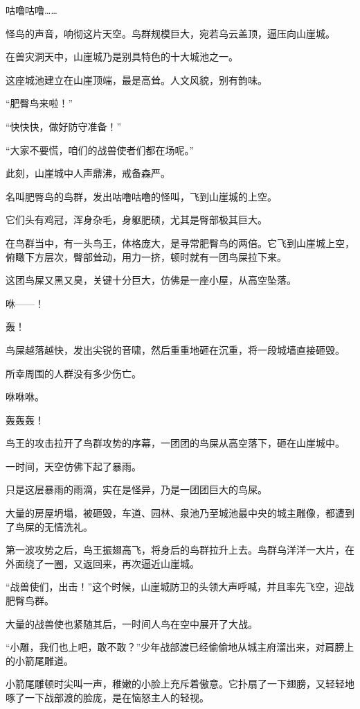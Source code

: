 
\begin{this_body}

咕噜咕噜……

怪鸟的声音，响彻这片天空。鸟群规模巨大，宛若乌云盖顶，逼压向山崖城。

在兽灾洞天中，山崖城乃是别具特色的十大城池之一。

这座城池建立在山崖顶端，最是高耸。人文风貌，别有韵味。

“肥臀鸟来啦！”

“快快快，做好防守准备！”

“大家不要慌，咱们的战兽使者们都在场呢。”

此刻，山崖城中人声鼎沸，戒备森严。

名叫肥臀鸟的鸟群，发出咕噜咕噜的怪叫，飞到山崖城的上空。

它们头有鸡冠，浑身杂毛，身躯肥硕，尤其是臀部极其巨大。

在鸟群当中，有一头鸟王，体格庞大，是寻常肥臀鸟的两倍。它飞到山崖城上空，俯瞰下方层次，臀部耸动，用力一挤，顿时就有一团鸟屎拉下来。

这团鸟屎又黑又臭，关键十分巨大，仿佛是一座小屋，从高空坠落。

咻——！

轰！

鸟屎越落越快，发出尖锐的音啸，然后重重地砸在沉重，将一段城墙直接砸毁。

所幸周围的人群没有多少伤亡。

咻咻咻。

轰轰轰！

鸟王的攻击拉开了鸟群攻势的序幕，一团团的鸟屎从高空落下，砸在山崖城中。

一时间，天空仿佛下起了暴雨。

只是这层暴雨的雨滴，实在是怪异，乃是一团团巨大的鸟屎。

大量的房屋坍塌，被砸毁，车道、园林、泉池乃至城池最中央的城主雕像，都遭到了鸟屎的无情洗礼。

第一波攻势之后，鸟王振翅高飞，将身后的鸟群拉升上去。鸟群乌洋洋一大片，在外面绕了一圈，又返回来，再次逼近山崖城。

“战兽使们，出击！”这个时候，山崖城防卫的头领大声呼喊，并且率先飞空，迎战肥臀鸟群。

大量的战兽使也紧随其后，一时间人鸟在空中展开了大战。

“小雕，我们也上吧，敢不敢？”少年战部渡已经偷偷地从城主府溜出来，对肩膀上的小箭尾雕道。

小箭尾雕顿时尖叫一声，稚嫩的小脸上充斥着傲意。它扑扇了一下翅膀，又轻轻地啄了一下战部渡的脸庞，是在恼怒主人的轻视。


\end{this_body}
